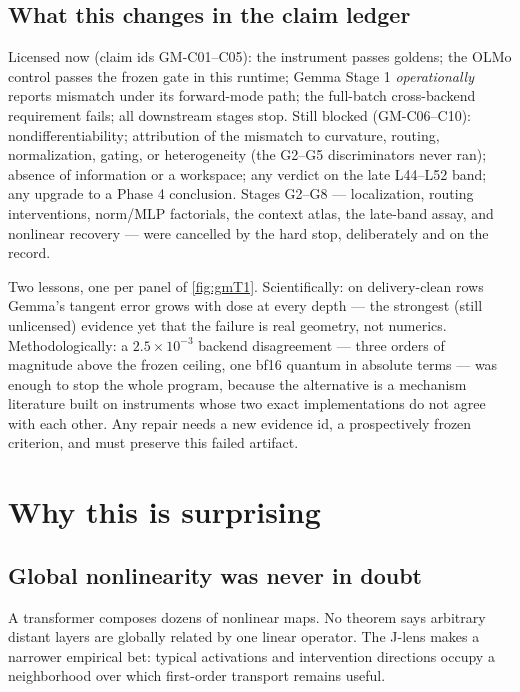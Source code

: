 \documentclass[11pt]{article}
\theoremstyle{definition}
\theoremstyle{remark}
\begin{document}
\subsection{What this changes in the claim ledger}
Licensed now (claim ids GM-C01--C05): the instrument passes goldens; the OLMo
control passes the frozen gate in this runtime; Gemma Stage 1
\emph{operationally} reports mismatch under its forward-mode path; the
full-batch cross-backend requirement fails; all downstream stages stop.
Still blocked (GM-C06--C10): nondifferentiability; attribution of the
mismatch to curvature, routing, normalization, gating, or heterogeneity
(the G2--G5 discriminators never ran); absence of information or a
workspace; any verdict on the late L44--L52 band; any upgrade to a Phase 4
conclusion. Stages G2--G8 --- localization, routing interventions, norm/MLP
factorials, the context atlas, the late-band assay, and nonlinear recovery
--- were cancelled by the hard stop, deliberately and on the record.

\begin{takeawaybox}
Two lessons, one per panel of \cref{fig:gmT1}. Scientifically: on delivery-clean
rows Gemma's tangent error grows with dose at every depth --- the strongest
(still unlicensed) evidence yet that the failure is real geometry, not
numerics. Methodologically: a $2.5\times10^{-3}$ backend disagreement ---
three orders of magnitude above the frozen ceiling, one bf16 quantum in
absolute terms --- was enough to stop the whole program, because the
alternative is a mechanism literature built on instruments whose two exact
implementations do not agree with each other. Any repair needs a new evidence
id, a prospectively frozen criterion, and must preserve this failed artifact.
\end{takeawaybox}

\section{Why this is surprising}

\subsection{Global nonlinearity was never in doubt}
A transformer composes dozens of nonlinear maps. No theorem says arbitrary distant layers are globally related by one linear operator. The J-lens makes a narrower empirical bet: typical activations and intervention directions occupy a neighborhood over which first-order transport remains useful.
\end{document}

